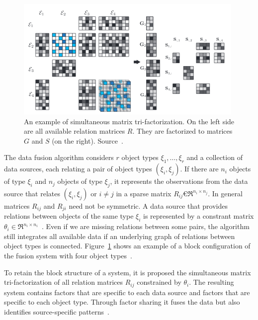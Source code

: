 \documentclass{article} %
\begin{document}
\begin{figure}[!ht]
\centering 
\includegraphics[width=.8\textwidth]{Izbor_037.png}
\caption{An example of simultaneous matrix tri-factorization. 
On the left side are all available relation matrices $R$. 
They are factorized to matrices $G$ and $S$ (on the right). 
Source~\cite{zitnik2015data}.}
\label{f:zlitje_matricne_tri-faktorizacije}
\end{figure}

The data fusion algorithm considers $r$ object types $\xi_1,…,\xi_r$ and a 
collection of data sources, each relating a pair of object types 
$(\xi_i,\xi_j)$. If there are $n_i$ objects of type $\xi_i$ and $n_j$ objects of 
type $\xi_j$, it represents the observations from the data source that relates 
$(\xi_i,\xi_j)$ or $i \neq j$ in a sparse matrix $R_{ij} € \Re^{n_i \times 
n_j}$. In general matrices $R_{ij}$ and $R_{ji}$ need not be symmetric. A data 
source that provides relations between objects of the same type $\xi_i$ is 
represented by a constrant matrix $\theta_i \in \Re^{n_i \times 
n_i}$~\cite{zitnik2015data}.  
Even if we are missing relations between some pairs, the algorithm still 
integrates all available data if an underlying graph of relations between object 
types is connected. Figure~\ref{f:zlitje_matricne_tri-faktorizacije} shows an 
example of a block configuration of the fusion system with four object 
types~\cite{zitnik2015data}.

To retain the block structure of a system, it is proposed the simultaneous 
matrix tri-factorization of all relation matrices $R_{ij}$ constrained by 
$\theta_i$. The resulting system contains factors that are specific to each data 
source and factors that are specific to each object type. Through factor sharing 
it fuses the data but also identifies source-specific 
patterns~\cite{zitnik2015data}.
\end{document}
